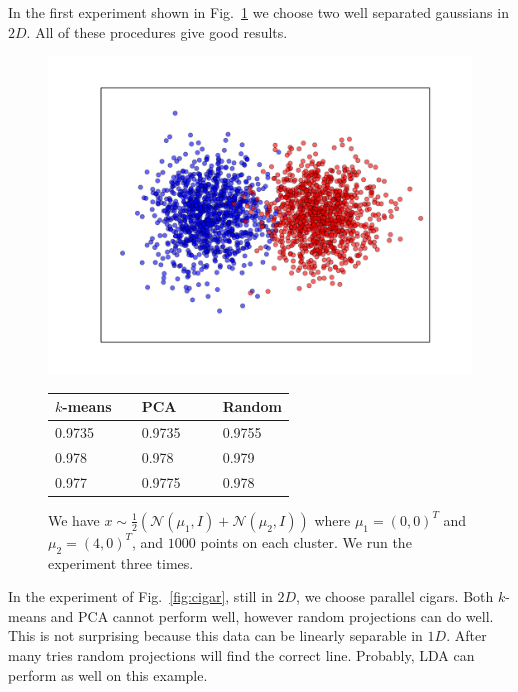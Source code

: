 \documentclass[aps,preprint,nofootinbib,floatfix]{revtex4-1}
\begin{document}
In the first experiment shown in Fig.~\ref{fig:2d_gauss_sep} we choose
two well separated gaussians in $2D$. All of these procedures give good
results.

\begin{figure}
\begin{minipage}{.49\textwidth}
\includegraphics[scale=.45]{2d_gauss_separate.pdf}
\end{minipage}
\begin{minipage}{.49\textwidth}
\begin{tabular}{ l  l  l }
\hline
$k$-means~~ & PCA~~~~ & Random \\
\hline
0.9735 & 0.9735 & 0.9755 \\
0.978 & 0.978 & 0.979 \\
0.977 &  0.9775 & 0.978 \\
\hline
\end{tabular}
\end{minipage}
\caption{\label{fig:2d_gauss_sep}
We have $x \sim \tfrac{1}{2}\left( \mathcal{N}(\mu_1, I) +
\mathcal{N}(\mu_2, I)\right)$ where $\mu_1 = (0,0)^T$ and $\mu_2=(4,0)^T$,
and $1000$ points on each cluster. We run the experiment three times.
}
\end{figure}

In the experiment of Fig.~\ref{fig:cigar}, still in $2D$, we choose
parallel cigars. Both $k$-means and PCA cannot perform well, however random
projections can do well. This is not surprising because this data
can be linearly separable in $1D$. After many tries random projections will
find the correct line. Probably, LDA can perform as well on this example.
\end{document}
